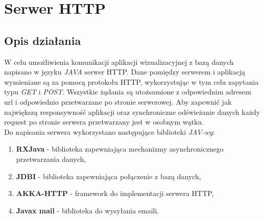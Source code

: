 \chapter{Serwer HTTP}
\section{Opis działania}
W celu umożliwienia komunikacji aplikacji wizualizacyjnej z bazą danych napisano w języku \textit{JAVA} serwer HTTP. Dane pomiędzy serwerem i aplikacją wymieniane są za pomocą protokołu HTTP, wykorzystując w tym celu zapytania typu \textit{GET} i \textit{POST}. Wszystkie żądania są utożsamione z odpowiednim adresem url i odpowiednio przetwarzane po stronie serwerowej. Aby zapewnić jak największą responsywność aplikacji oraz synchroniczne odświeżanie danych każdy request po stronie serwera przetwarzany jest w osobnym wątku. \\
Do napisania serwera wykorzystano następujące biblioteki \textit{JAV-wy}:
\begin{enumerate}
	\item \textbf{RXJava} - biblioteka zapewniająca mechanizmy asynchronicznego przetwarzania danych,
	\item \textbf{JDBI} - biblioteka zapewniająca połączenie z bazą danych,
	\item \textbf{AKKA-HTTP} - framework do implementacji serwera HTTP,
	 \item \textbf{Javax mail} - biblioteka do wysyłania emaili.
\end{enumerate}